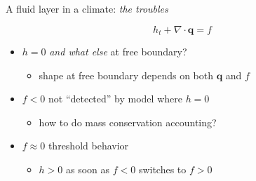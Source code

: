 \documentclass{beamer}
\newcommand\bq{\mathbf{q}}
\newcommand{\Div}{\nabla\cdot}
\begin{document}
\begin{frame}{A fluid layer in a climate: \emph{the troubles}}

\begin{center}
\end{center}

\vspace{-18mm}
$$h_t + \Div\bq = f$$

  \begin{itemize}
  \item<1-> $h=0$ \emph{and what else} at free boundary?
     \begin{itemize}
     \item<1->[$\circ$] shape at free boundary depends on both $\bq$ and $f$
     \end{itemize}
  \item<2-> $f<0$ not ``detected'' by model where $h=0$
     \begin{itemize}
     \item<2->[$\circ$] how to do mass conservation accounting?
     \end{itemize}
  \item<3> $f\approx 0$ threshold behavior
     \begin{itemize}
     \item<3>[$\circ$] $h>0$ as soon as $f<0$ switches to $f>0$
     \end{itemize}
  \end{itemize}
\end{frame}
\end{document}
